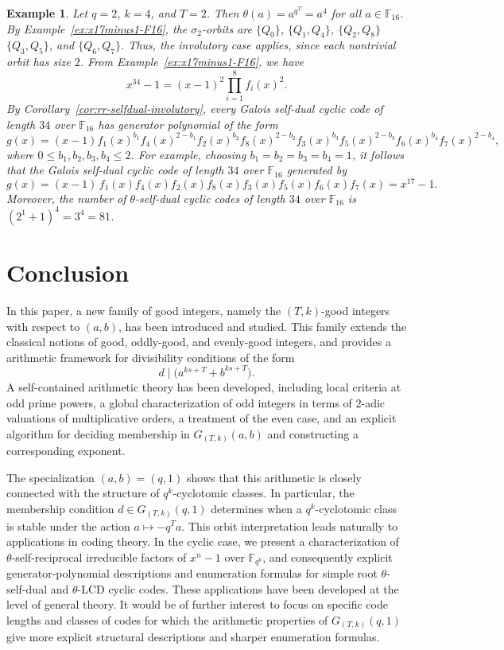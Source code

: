 \documentclass[pdflatex,sn-mathphys-num]{sn-jnl}%
\theoremstyle{thmstyleone}%
\theoremstyle{thmstyletwo}%
\newtheorem{example}{Example}%
\theoremstyle{thmstylethree}%
\newcommand{\F}{\mathbb{F}}
\begin{document}
\begin{example}\label{ex:theta-selfdual-34-T2}
Let $q=2$, $k=4$, and $T=2$. Then
$
\theta(a)=a^{q^T}=a^4$
for all $a\in \F_{16}$.
By Example~\ref{ex:x17minus1-F16}, the $\sigma_2$-orbits are
$
\{Q_0\}$, $\{Q_1,Q_4\}$, $ \{Q_2,Q_8\}$ $ \{Q_3,Q_5\}$,  and $\{Q_6,Q_7\}$.
Thus, the involutory case applies, since each nontrivial orbit has size $2$. From Example~\ref{ex:x17minus1-F16}, we have 
\[
x^{34}-1=(x-1)^2\prod_{i=1}^8 f_i(x)^2.
\]
By Corollary~\ref{cor:rr-selfdual-involutory}, every Galois self-dual cyclic code of length $34$ over $\F_{16}$ has generator polynomial of the form
\[
g(x)
=
(x-1)
f_1(x)^{b_1}f_4(x)^{2-b_1}
f_2(x)^{b_2}f_8(x)^{2-b_2}
f_3(x)^{b_3}f_5(x)^{2-b_3}
f_6(x)^{b_4}f_7(x)^{2-b_4},
\]
where
$
0\le b_1,b_2,b_3,b_4\le 2$.
For example, choosing
$
b_1=b_2=b_3=b_4=1$,
it follows that the Galois self-dual cyclic code of length $34$ over $\F_{16}$ generated by
\[
g(x)=(x-1)\,f_1(x)f_4(x)f_2(x)f_8(x)f_3(x)f_5(x)f_6(x)f_7(x)=x^{17}-1.
\]
Moreover, the number of $\theta$-self-dual cyclic codes of length $34$ over $\F_{16}$ is
$
(2^1+1)^4=3^4=81$.
\end{example}

 


\section{Conclusion}
\label{sec6}


In this paper, a new family of good integers, namely the $(T,k)$-good integers with respect to $(a,b)$, has been introduced and studied. This family extends the classical notions of good, oddly-good, and evenly-good integers, and provides a   arithmetic framework for divisibility conditions of the form
\[
d\mid \bigl(a^{ks+T}+b^{ks+T}\bigr).
\]
A self-contained arithmetic theory has been developed, including local criteria at odd prime powers, a global characterization of odd integers in terms of $2$-adic valuations of multiplicative orders, a treatment of the even case, and an explicit algorithm for deciding membership in $G_{(T,k)}(a,b)$ and constructing a corresponding exponent.

The specialization $(a,b)=(q,1)$ shows that this arithmetic is closely connected with the structure of $q^k$-cyclotomic classes. In particular, the membership condition
$
d\in G_{(T,k)}(q,1)$
determines when a $q^k$-cyclotomic class is stable under the action $
a\mapsto -q^Ta$.
This orbit  interpretation leads naturally to applications in coding theory. In the cyclic case,  we present a characterization of $\theta$-self-reciprocal irreducible factors of $x^n-1$ over $\F_{q^k}$, and consequently explicit generator-polynomial descriptions and enumeration formulas for simple root $\theta$-self-dual and $\theta$-LCD cyclic codes. These applications  have been developed at the level of general theory. It would be of further interest to focus on specific code lengths and classes of codes for which the arithmetic properties of $G_{(T,k)}(q,1)$ give more explicit structural descriptions and sharper enumeration formulas.
\end{document}
